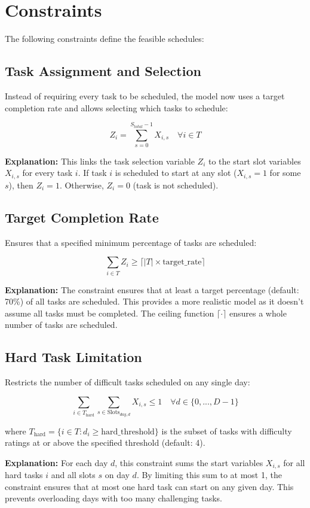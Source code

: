 \documentclass{article}
\begin{document}
\section{Constraints}

The following constraints define the feasible schedules:

\subsection{Task Assignment and Selection}

Instead of requiring every task to be scheduled, the model now uses a target completion rate and allows selecting which tasks to schedule:

\[
Z_i = \sum_{s=0}^{S_{total}-1} X_{i,s} \quad \forall i \in T
\]

\textbf{Explanation:} This links the task selection variable $Z_i$ to the start slot variables $X_{i,s}$ for every task $i$. If task $i$ is scheduled to start at any slot ($X_{i,s}=1$ for some $s$), then $Z_i=1$. Otherwise, $Z_i=0$ (task is not scheduled).

\subsection{Target Completion Rate}
Ensures that a specified minimum percentage of tasks are scheduled:

\[
\sum_{i \in T} Z_{i} \geq \lceil |T| \times \text{target\_rate} \rceil
\]

\textbf{Explanation:} The constraint ensures that at least a target percentage (default: 70\%) of all tasks are scheduled. This provides a more realistic model as it doesn't assume all tasks must be completed. The ceiling function $\lceil \cdot \rceil$ ensures a whole number of tasks are scheduled.

\subsection{Hard Task Limitation}
Restricts the number of difficult tasks scheduled on any single day:

\[
\sum_{i \in T_{\text{hard}}} \sum_{s \in \text{Slots}_{day,d}} X_{i,s} \leq 1 \quad \forall d \in \{0, ..., D-1\}
\]

where $T_{\text{hard}} = \{i \in T : d_i \geq \text{hard\_threshold}\}$ is the subset of tasks with difficulty ratings at or above the specified threshold (default: 4).

\textbf{Explanation:} For each day $d$, this constraint sums the start variables $X_{i,s}$ for all hard tasks $i$ and all slots $s$ on day $d$. By limiting this sum to at most 1, the constraint ensures that at most one hard task can start on any given day. This prevents overloading days with too many challenging tasks.
\end{document}
